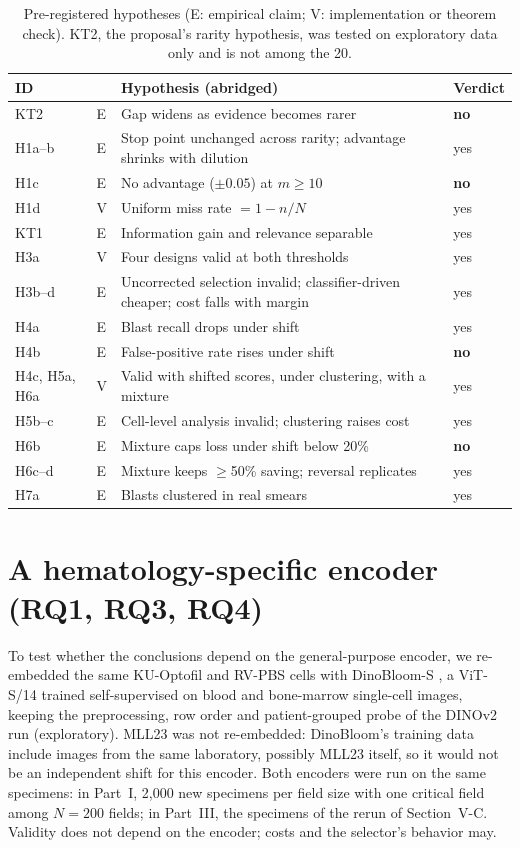 \documentclass[journal]{IEEEtran}
\begin{document}
\begin{table}[t]
\centering\footnotesize
\caption{Pre-registered hypotheses (E: empirical claim; V: implementation or theorem check). KT2, the proposal's rarity hypothesis, was tested on exploratory data only and is not among the 20.}\label{tab:hyp}
\setlength{\tabcolsep}{3pt}
\begin{tabular}{@{}llL{4.6cm}l@{}}
\toprule
ID & & Hypothesis (abridged) & Verdict\\
\midrule
KT2 & E & Gap widens as evidence becomes rarer & \textbf{no}\\
H1a--b & E & Stop point unchanged across rarity; advantage shrinks with dilution & yes\\
H1c & E & No advantage ($\pm0.05$) at $m\ge10$ & \textbf{no}\\
H1d & V & Uniform miss rate $=1-n/N$ & yes\\
KT1 & E & Information gain and relevance separable & yes\\
H3a & V & Four designs valid at both thresholds & yes\\
H3b--d & E & Uncorrected selection invalid; classifier-driven cheaper; cost falls with margin & yes\\
H4a & E & Blast recall drops under shift & yes\\
H4b & E & False-positive rate rises under shift & \textbf{no}\\
H4c, H5a, H6a & V & Valid with shifted scores, under clustering, with a mixture & yes\\
H5b--c & E & Cell-level analysis invalid; clustering raises cost & yes\\
H6b & E & Mixture caps loss under shift below 20\% & \textbf{no}\\
H6c--d & E & Mixture keeps $\ge$50\% saving; reversal replicates & yes\\
H7a & E & Blasts clustered in real smears & yes\\
\bottomrule
\end{tabular}
\end{table}

\section{A hematology-specific encoder (RQ1, RQ3, RQ4)}
To test whether the conclusions depend on the general-purpose encoder, we re-embedded the same KU-Optofil and RV-PBS cells with DinoBloom-S \cite{koch2024dinobloom}, a ViT-S/14 trained self-supervised on blood and bone-marrow single-cell images, keeping the preprocessing, row order and patient-grouped probe of the DINOv2 run (exploratory). MLL23 was not re-embedded: DinoBloom's training data include images from the same laboratory, possibly MLL23 itself, so it would not be an independent shift for this encoder. Both encoders were run on the same specimens: in Part~I, 2,000 new specimens per field size with one critical field among $N=200$ fields; in Part~III, the specimens of the rerun of Section~V-C. Validity does not depend on the encoder; costs and the selector's behavior may.
\end{document}
